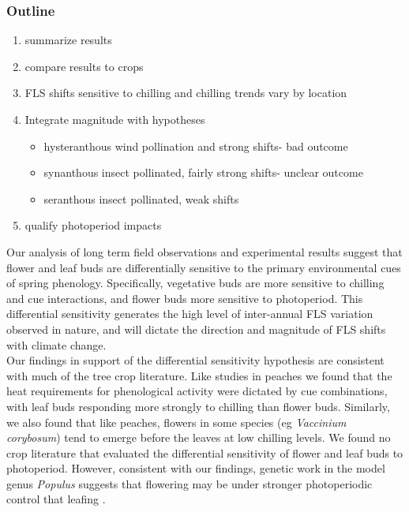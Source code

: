 \documentclass[11pt]{article}
\begin{document}
\subsubsection*{Outline}
\begin{enumerate}
\item summarize results
\item compare results to crops
\item FLS shifts sensitive to chilling and chilling trends vary by location
\item Integrate magnitude with hypotheses
\begin{itemize}
\item hysteranthous wind pollination and strong shifts- bad outcome
\item synanthous insect pollinated, fairly strong shifts- unclear outcome
\item seranthous insect pollinated, weak shifts
\end{itemize}
\item qualify photoperiod impacts
\end{enumerate}

\noindent Our analysis of long term field observations and experimental results suggest that flower and leaf buds are differentially sensitive to the primary environmental cues of spring phenology. Specifically, vegetative buds are more sensitive to chilling and cue interactions, and flower buds more sensitive to photoperiod. This differential sensitivity generates the high level of inter-annual FLS variation observed in nature, and will dictate the direction and magnitude of FLS shifts with climate change.\\

\noindent Our findings in support of the differential sensitivity hypothesis are consistent with much of the tree crop literature. Like studies in peaches \citep{Garigalio20106,Citidin2001} we found that the heat requirements for phenological activity were dictated by cue combinations, with leaf buds responding more strongly to chilling than flower buds. Similarly, we also found that like peaches, flowers in some species (eg \textit{Vaccinium corybosum}) tend to emerge before the leaves at low chilling levels. We found no crop literature that evaluated the differential sensitivity of flower and leaf buds to photoperiod. However, consistent with our findings, genetic work in the model genus \textit{Populus} suggests that flowering may be under stronger photoperiodic control that leafing \citep{}.
\end{document}
